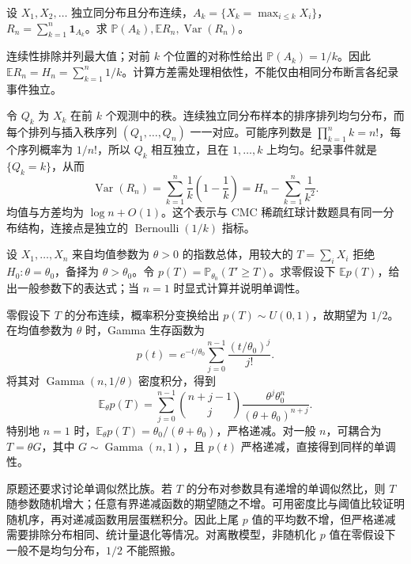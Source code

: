 \documentclass[UTF8,12pt,a4paper,fontset=fandol]{ctexbook}
\newcommand{\E}{\mathbb E}
\newcommand{\PP}{\mathbb P}
\DeclareMathOperator{\Var}{Var}
\begin{document}
\begin{example}[原题3：纪录次数]\label{yau:2013-3}
设 $X_1,X_2,\ldots$ 独立同分布且分布连续，$A_k=\{X_k=\max_{i\le k}X_i\}$，$R_n=\sum_{k=1}^n\mathbf1_{A_k}$。求 $\PP(A_k),\E R_n,\Var(R_n)$。
\end{example}
\begin{solve}
连续性排除并列最大值；对前 $k$ 个位置的对称性给出 $\PP(A_k)=1/k$。因此 $\E R_n=H_n=\sum_{k=1}^n1/k$。计算方差需处理相依性，不能仅由相同分布断言各纪录事件独立。

令 $Q_k$ 为 $X_k$ 在前 $k$ 个观测中的秩。连续独立同分布样本的排序排列均匀分布，而每个排列与插入秩序列 $(Q_1,\ldots,Q_n)$ 一一对应。可能序列数是 $\prod_{k=1}^nk=n!$，每个序列概率为 $1/n!$，所以 $Q_k$ 相互独立，且在 $1,\ldots,k$ 上均匀。纪录事件就是 $\{Q_k=k\}$，从而
\[
\Var(R_n)=\sum_{k=1}^n\frac1k\left(1-\frac1k\right)=H_n-\sum_{k=1}^n\frac1{k^2}.
\]
均值与方差均为 $\log n+O(1)$。这个表示与 CMC 稀疏红球计数题具有同一分布结构，连接点是独立的 $\operatorname{Bernoulli}(1/k)$ 指标。
\end{solve}

\begin{example}[原题4：指数模型的平均 $p$ 值]\label{yau:2013-4}
设 $X_1,\ldots,X_n$ 来自均值参数为 $\theta>0$ 的指数总体，用较大的 $T=\sum_iX_i$ 拒绝 $H_0:\theta=\theta_0$，备择为 $\theta>\theta_0$。令 $p(T)=\PP_{\theta_0}(T'\ge T)$。求零假设下 $\E p(T)$，给出一般参数下的表达式；当 $n=1$ 时显式计算并说明单调性。
\end{example}
\begin{solve}
零假设下 $T$ 的分布连续，概率积分变换给出 $p(T)\sim U(0,1)$，故期望为 $1/2$。在均值参数为 $\theta$ 时，Gamma 生存函数为
\[
p(t)=e^{-t/\theta_0}\sum_{j=0}^{n-1}\frac{(t/\theta_0)^j}{j!}.
\]
将其对 $\operatorname{Gamma}(n,1/\theta)$ 密度积分，得到
\[
\E_\theta p(T)=\sum_{j=0}^{n-1}\binom{n+j-1}{j}\frac{\theta^j\theta_0^n}{(\theta+\theta_0)^{n+j}}.
\]
特别地 $n=1$ 时，$\E_\theta p(T)=\theta_0/(\theta+\theta_0)$，严格递减。对一般 $n$，可耦合为 $T=\theta G$，其中 $G\sim\operatorname{Gamma}(n,1)$，且 $p(t)$ 严格递减，直接得到同样的单调性。

原题还要求讨论单调似然比族。若 $T$ 的分布对参数具有递增的单调似然比，则 $T$ 随参数随机增大；任意有界递减函数的期望随之不增。可用密度比与阈值比较证明随机序，再对递减函数用层蛋糕积分。因此上尾 $p$ 值的平均数不增，但严格递减需要排除分布相同、统计量退化等情况。对离散模型，非随机化 $p$ 值在零假设下一般不是均匀分布，$1/2$ 不能照搬。
\end{solve}
\end{document}
